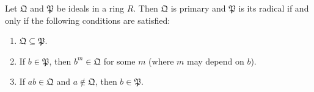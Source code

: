 Let $\mathfrak{Q}$ and $\mathfrak{P}$ be ideals in a ring $R$. Then $\mathfrak{Q}$ is primary and $\mathfrak{P}$ is its radical if and only if the following conditions are satisfied:
\begin{enumerate}
\item[(a)] $\mathfrak{Q} \subseteq \mathfrak{P}$.
\item[(b)] If $b \in \mathfrak{P}$, then $b^m \in \mathfrak{Q}$ for some $m$ (where $m$ may depend on $b$).
\item[(c)] If $ab \in \mathfrak{Q}$ and $a \notin \mathfrak{Q}$, then $b \in \mathfrak{P}$.
\end{enumerate}
